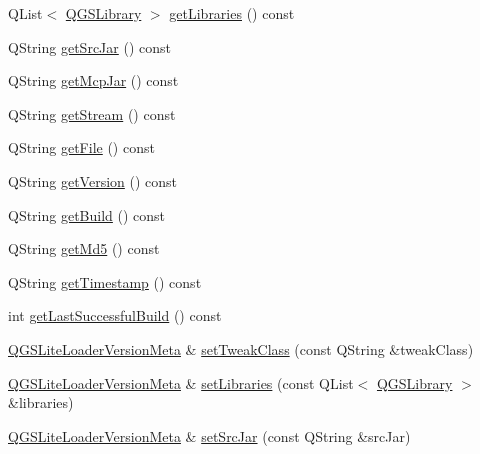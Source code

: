 \begin{DoxyCompactItemize}
\item 
Q\+List$<$ \mbox{\hyperlink{class_q_g_s_library}{Q\+G\+S\+Library}} $>$ \mbox{\hyperlink{class_q_g_s_lite_loader_version_meta_a2fcbc2c4da14dea89956a12cc41db26f}{get\+Libraries}} () const
\item 
Q\+String \mbox{\hyperlink{class_q_g_s_lite_loader_version_meta_a2ac78798df89880fd66baba24342be98}{get\+Src\+Jar}} () const
\item 
Q\+String \mbox{\hyperlink{class_q_g_s_lite_loader_version_meta_a911e828dc78b59e178e6a692497ba960}{get\+Mcp\+Jar}} () const
\item 
Q\+String \mbox{\hyperlink{class_q_g_s_lite_loader_version_meta_a41d242842bf889493d3ecfc27e5e9996}{get\+Stream}} () const
\item 
Q\+String \mbox{\hyperlink{class_q_g_s_lite_loader_version_meta_a64ba8805677e5b369fd3b90d92044c61}{get\+File}} () const
\item 
Q\+String \mbox{\hyperlink{class_q_g_s_lite_loader_version_meta_aee21b578b6d3163a4c03bf952a274755}{get\+Version}} () const
\item 
Q\+String \mbox{\hyperlink{class_q_g_s_lite_loader_version_meta_a446b5f4f9b393b136cf1f010b095bcbb}{get\+Build}} () const
\item 
Q\+String \mbox{\hyperlink{class_q_g_s_lite_loader_version_meta_a9c8971911d09d757c35197186317c412}{get\+Md5}} () const
\item 
Q\+String \mbox{\hyperlink{class_q_g_s_lite_loader_version_meta_a494ada211b37e5e8778feeb394259882}{get\+Timestamp}} () const
\item 
int \mbox{\hyperlink{class_q_g_s_lite_loader_version_meta_ac150d06c69146ef93234cf5eec547e54}{get\+Last\+Successful\+Build}} () const
\item 
\mbox{\hyperlink{class_q_g_s_lite_loader_version_meta}{Q\+G\+S\+Lite\+Loader\+Version\+Meta}} \& \mbox{\hyperlink{class_q_g_s_lite_loader_version_meta_a370f0bb604d3a0124728bd704c7f14de}{set\+Tweak\+Class}} (const Q\+String \&tweak\+Class)
\item 
\mbox{\hyperlink{class_q_g_s_lite_loader_version_meta}{Q\+G\+S\+Lite\+Loader\+Version\+Meta}} \& \mbox{\hyperlink{class_q_g_s_lite_loader_version_meta_a368ca504ca58c6fbab9e5b6ddb1bad67}{set\+Libraries}} (const Q\+List$<$ \mbox{\hyperlink{class_q_g_s_library}{Q\+G\+S\+Library}} $>$ \&libraries)
\item 
\mbox{\hyperlink{class_q_g_s_lite_loader_version_meta}{Q\+G\+S\+Lite\+Loader\+Version\+Meta}} \& \mbox{\hyperlink{class_q_g_s_lite_loader_version_meta_afac4a809095a11dfa89840e8307288a2}{set\+Src\+Jar}} (const Q\+String \&src\+Jar)

\end{DoxyCompactItemize}
